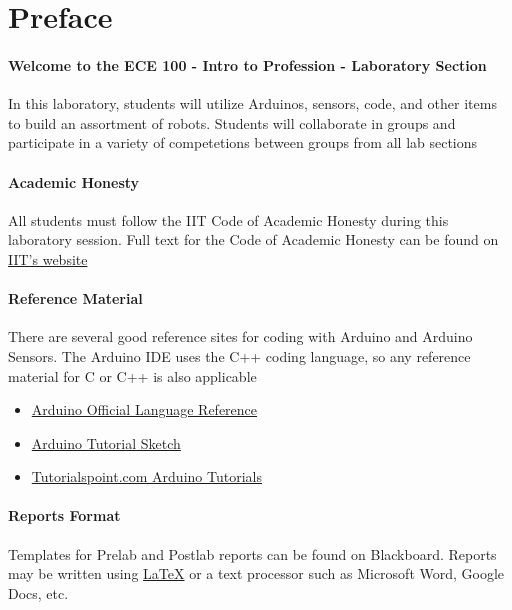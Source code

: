 \pagebreak
\section{Preface}

\paragraph{Welcome to the ECE 100 - Intro to Profession - Laboratory Section}{
In this laboratory, students will utilize Arduinos, sensors, code, and other items to build an assortment of robots. Students will collaborate in groups and participate in a variety of competetions between groups from all lab sections}

\paragraph{Academic Honesty}{
All students must follow the IIT Code of Academic Honesty during this laboratory session. Full text for the Code of Academic Honesty can be found on \href{https://www.iit.edu/student-affairs/student-handbook/fine-print/code-academic-honesty}{IIT's website}}

\paragraph{Reference Material}{
There are several good reference sites for coding with Arduino and Arduino Sensors. The Arduino IDE uses the C++ coding language, so any reference material for C or C++ is also applicable
\begin{itemize}
	\item \href{https://www.arduino.cc/reference/en/}{Arduino Official Language Reference}
	\item \href{https://www.arduino.cc/en/tutorial/sketch}{Arduino Tutorial Sketch}
	\item \href{https://www.tutorialspoint.com/arduino/index.htm}{Tutorialspoint.com Arduino Tutorials}
\end{itemize}
}

\paragraph{Reports Format}{ Templates for Prelab and Postlab reports can be found on Blackboard. Reports may be written using \href{https://www.latex-project.org/}{LaTeX} or a text processor such as Microsoft Word, Google Docs, etc.
}